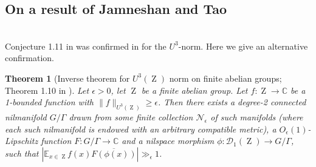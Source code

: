 \documentclass[a4paper,12pt,reqno]{amsart}
\newtheorem{theorem}{Theorem}[section]
\theoremstyle{definition}
\def\to{\rightarrow}
\newcommand{\mc}{\mathcal}
\newcommand{\mb}{\mathbb}
\DeclareMathOperator{\ab}{Z}
\begin{document}
\subsection{On a result of Jamneshan and Tao}\hfill\smallskip\\
\noindent Conjecture 1.11 in \cite{J&T} was confirmed in \cite[Theorem 1.10]{J&T} for the $U^3$-norm. Here we give an alternative confirmation.

\begin{theorem}[Inverse theorem for $U^3(\ab)$ norm on finite abelian groups; Theorem 1.10 in \cite{J&T}]\label{thm:jam-tao}
Let $\epsilon>0$, let $\ab$ be a finite abelian group. Let $f:\ab\to \mb{C}$ be a 1-bounded function with $\|f\|_{U^{3}(\ab)}\ge \epsilon$. Then there exists a degree-2 connected nilmanifold $G/\Gamma$ drawn from some finite collection $\mc{N}_\epsilon$ of such manifolds (where each such nilmanifold is  endowed with an arbitrary compatible metric), a $O_\epsilon(1)$-Lipschitz function $F:G/\Gamma\to \mb{C}$ and a nilspace morphism $\phi:\mc{D}_1(\ab)\to G/\Gamma$, such that $|\mb{E}_{x\in \ab} f(x) \overline{F(\phi(x))}|\gg_{\epsilon} 1$.
\end{theorem}
\end{document}
